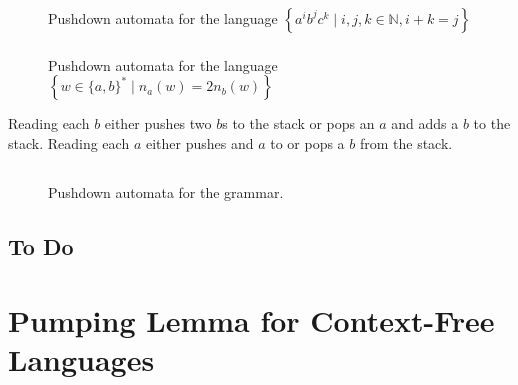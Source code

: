 \documentclass{article}
\numberwithin{equation}{subsection}
\begin{document}
\subsubsection{}
\begin{figure}[H]
\centering

\caption{Pushdown automata for the language \(\left\{a^ib^jc^k\mid i,j,k\in \mathbb{N}, i+k=j\right\}\)}
\label{fig:automata3-1-2}
\end{figure}

\subsubsection{}
\begin{figure}[H]
\centering

\caption{Pushdown automata for the language \(\left\{w\in\{a,b\}^*\mid n_a(w)=2n_b(w)\right\}\)}
\label{fig:automata3-1-3}
\end{figure}
Reading each \(b\) either pushes two \(b\)s to the stack or pops an \(a\) and adds a \(b\) to the stack.
Reading each \(a\) either pushes and \(a\) to or pops a \(b\) from the stack.

\subsection{}
\begin{figure}[H]
\centering

\caption{Pushdown automata for the grammar.}
\label{fig:automata3-2}
\end{figure}

\subsection{To Do}

\section{Pumping Lemma for Context-Free Languages}
\end{document}
